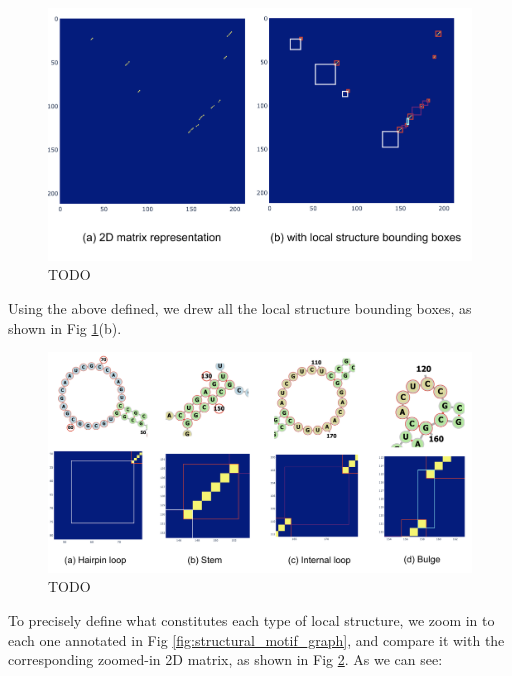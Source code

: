 \documentclass{article}
\begin{document}
\begin{figure}[h]
    \centering
    \includegraphics[width=\textwidth]{plot/structural_motif_2d_matrix.png}
    \caption{TODO}
    \label{fig:structural_motif_2d_matrix}
    \centering
\end{figure}





Using the above defined, we drew all the local structure bounding boxes,
as shown in Fig \ref{fig:structural_motif_2d_matrix}(b).


\begin{figure}[h]
    \centering
    \includegraphics[width=\textwidth]{plot/local_bounding_box_examples.png}
    \caption{TODO}
    \label{fig:local_bounding_box_examples}
    \centering
\end{figure}


To precisely define what constitutes each type of local structure,
we zoom in to each one annotated in Fig \ref{fig:structural_motif_graph},
and compare it with the corresponding zoomed-in 2D matrix, as shown in
Fig \ref{fig:local_bounding_box_examples}.
As we can see:
\end{document}
